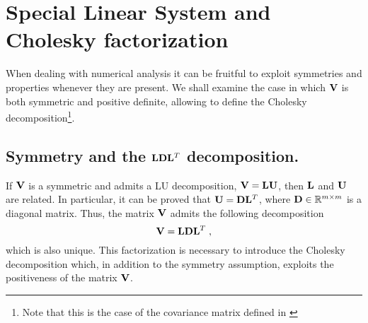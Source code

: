 \section{Special Linear System and Cholesky factorization}
When dealing with numerical analysis it can be fruitful to exploit symmetries and properties whenever they are present. We shall examine the case in which $\mathbf{V}$ is both symmetric and positive definite, allowing to define the Cholesky decomposition\footnote{\footnotesize{Note that this is the case of the covariance matrix defined in }}.

\subsection*{Symmetry and the $\mathbf{L} \mathbf{D} \mathbf{L}^T$ decomposition.}
If $\mathbf{V}$ is a symmetric and admits a LU decomposition, $\mathbf{V} = \mathbf{L} \mathbf{U}$, then $\mathbf{L}$ and $\mathbf{U}$ are related. In particular, it can be proved that $\mathbf{U} = \mathbf{D} \mathbf{L}^T$, where $\mathbf{D} \in \mathbb{R}^{m \times m}$ is a diagonal matrix. Thus, the matrix $\mathbf{V}$ admits the following decomposition
\begin{equation*}
    \mathbf{V} = \mathbf{L} \mathbf{D} \mathbf{L}^T \;,
\end{equation*}
which is also unique. This factorization is necessary to introduce the Cholesky decomposition which, in addition to the symmetry assumption, exploits the positiveness of the matrix $\mathbf{V}$.

